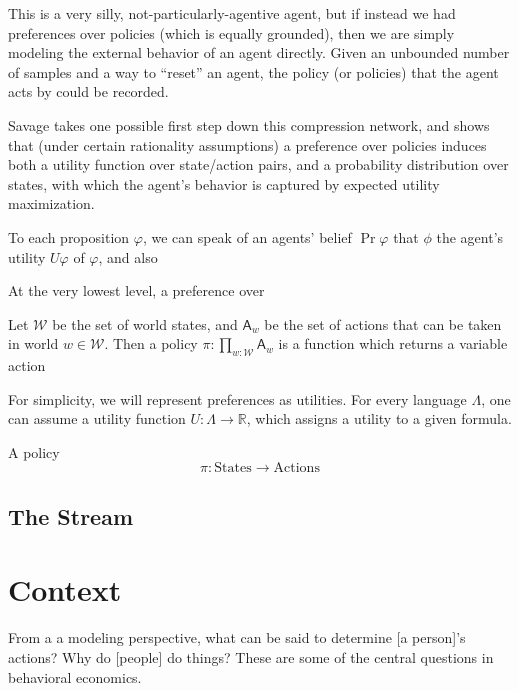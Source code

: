 \documentclass{book}
\begin{document}
	
	
	This is a very silly, not-particularly-agentive agent, but if instead we had preferences over policies (which is equally grounded), then we are simply modeling the external behavior of an agent directly. Given an unbounded number of samples and a way to ``reset'' an agent, the policy (or policies) that the agent acts by could be recorded. 
	
	Savage takes one possible first step down this compression network, and shows that (under certain rationality assumptions) a preference over policies induces both a utility function over state/action pairs, and a probability distribution over states, with which the agent's behavior is captured by expected utility maximization.
	
	
	
	To each proposition $\varphi$, we can speak of an agents' belief $\Pr\varphi$ that $\phi$ the agent's utility $U \varphi$ of $\varphi$, and also 
	
 	At the very lowest level, a preference over 
	
	
	Let $\mathcal W$ be the set of world states, and $\mathsf A_w$ be the set of actions that can be taken in world $w \in \mathcal W$. Then a policy $\pi : \prod_{w: \mathcal W} \mathsf A_w$ is a function which returns a variable action
	

	
	
	For simplicity, we will represent preferences as utilities. For every language $\Lambda$, one can assume a utility function $U : \Lambda \to \mathbb R$, which assigns a utility to a given formula. 
	
	A policy
		\[ \pi: \mathrm{States} \to \mathrm{Actions} \]
	
	
	
	\section{The Stream}

	\chapter{Context}
	From a a modeling perspective, what can be said to determine [a person]'s actions? Why do [people] do things? These are some of the central questions in behavioral economics. 
	
	
%			
	
\end{document}
